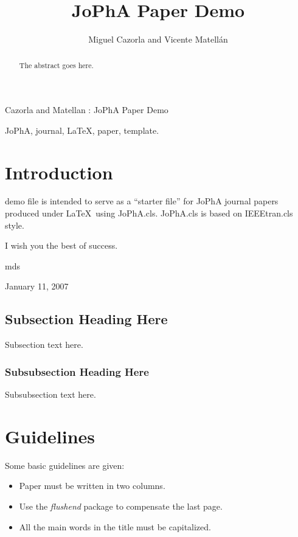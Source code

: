 \documentclass[journal,twoside]{JoPhA}
\begin{document}
\title{JoPhA Paper Demo}

\author{Miguel Cazorla and Vicente Matell\'an
}


%
{Cazorla and Matellan : JoPhA Paper Demo}
\maketitle


\begin{abstract}
The abstract goes here.
\end{abstract}


\begin{IEEEkeywords}
JoPhA, journal, \LaTeX, paper, template.
\end{IEEEkeywords}


\section{Introduction}

 demo file is intended to serve as a ``starter file''
for JoPhA journal papers produced under \LaTeX\ using
JoPhA.cls. JoPhA.cls is based on IEEEtran.cls style. 

I wish you the best of success.

\hfill mds
 
\hfill January 11, 2007

\subsection{Subsection Heading Here}
Subsection text here.


\subsubsection{Subsubsection Heading Here}
Subsubsection text here.


\section{Guidelines}
Some basic guidelines are given:
\begin{itemize}
\item Paper must be written in two columns.
\item Use the \emph{flushend} package to compensate the last page. 
\item All the main words in the title must be capitalized. 
\end{itemize}
\end{document}
